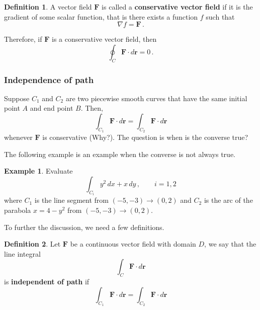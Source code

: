 \documentclass[
]{article}
\theoremstyle{definition}
\newtheorem{definition}{Definition}[section]
\theoremstyle{definition}
\newtheorem{example}{Example}[section]
\theoremstyle{definition}
\theoremstyle{definition}
\theoremstyle{remark}
\begin{document}
\begin{definition}
A vector field \(\mathbf{F}\) is called a \textbf{conservative vector field}
if it is the gradient of some scalar function, that is there exists
a function \(f\) such that
\begin{equation*}
    \nabla f = \mathbf{F} \,.
\end{equation*}
\end{definition}

Therefore, if \(\mathbf{F}\) is a conservative vector field, then
\begin{equation*}
    \oint_C \mathbf{F} \cdot d\mathbf{r} = 0 \,.
\end{equation*}

\hypertarget{independence-of-path}{%
\subsubsection{Independence of path}\label{independence-of-path}}

Suppose \(C_1\) and \(C_2\) are two piecewise smooth curves that have the same initial point \(A\)
and end point \(B\).
Then,
\begin{equation*}
    \int_{C_1} \mathbf{F}\cdot d\mathbf{r} 
    =
    \int_{C_2} \mathbf{F} \cdot d\mathbf{r} 
\end{equation*}
whenever \(\mathbf{F}\) is conservative (Why?).
The question is when is the converse true?

The following example is an example when the converse is not always true.

\begin{example}
Evaluate
\begin{equation*}
    \int_{C_i} y^2 \, dx + x\, dy \,, \qquad i = 1,2
\end{equation*}
where \(C_1\) is the line segment from \((-5,-3) \to (0,2)\) and
\(C_2\) is the arc of the parabola \(x = 4-y^2\) from \((-5,-3) \to (0,2)\).
\end{example}

To further the discussion, we need a few definitions.

\begin{definition}
Let \(\mathbf{F}\) be a continuous vector field with domain \(D\), we say that the
line integral
\begin{equation*}
    \int_C \mathbf{F} \cdot d\mathbf{r} 
\end{equation*}
is \textbf{independent of path} if
\begin{equation*}
    \int_{C_1} \mathbf{F}\cdot d\mathbf{r} 
    =
    \int_{C_2} \mathbf{F} \cdot d\mathbf{r} 
\end{equation*}
\end{definition}
\end{document}
